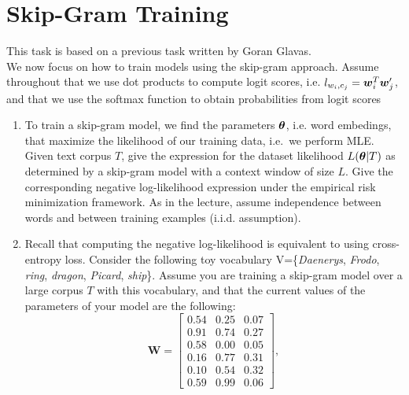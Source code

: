 \documentclass[11pt,a4paper]{article}
\begin{document}
\section{Skip-Gram Training}


This task is based on a previous task written by Goran Glavas. \\

We now focus on how to train models using the skip-gram approach.
Assume throughout that we use dot products to compute logit scores, i.e.
$l_{w_i,c_j} = {\boldsymbol{w}}_i^T{\boldsymbol{w}}'_j$, and that we use the softmax function to obtain
probabilities from logit scores

\begin{enumerate}[label=(\alph*)]
    \item To train a skip-gram model, we find the parameters ${\boldsymbol{\theta}}$, i.e.
          word embedings, that maximize the likelihood of our training data,
          i.e.\ we perform MLE.
          Given text corpus $T$, give the expression for the dataset likelihood
          $L({\boldsymbol{\theta}}|T)$ as determined by a skip-gram model with a context
          window of size $L$.
          Give the corresponding negative log-likelihood expression under the
          empirical risk minimization framework.
          As in the lecture, assume independence between words and between 
          training examples (i.i.d. assumption).
    \item Recall that computing the negative log-likelihood is equivalent to
          using cross-entropy loss.
          Consider the following toy vocabulary
          V=\{\textit{Daenerys}, \textit{Frodo}, \textit{ring}, \textit{dragon}, \textit{Picard}, \textit{ship}\}.
          Assume you are training a skip-gram model over a large corpus $T$ with
          this vocabulary, and that the current values of the parameters of your
          model are the following:
          \[
              \mathbf{W}=
              \begin{bmatrix}
                  0.54 & 0.25 & 0.07 \\
                  0.91 & 0.74 & 0.27 \\
                  0.58 & 0.00 & 0.05 \\
                  0.16 & 0.77 & 0.31 \\
                  0.10 & 0.54 & 0.32 \\
                  0.59 & 0.99 & 0.06
              \end{bmatrix},
\]
\end{enumerate}
\end{document}
